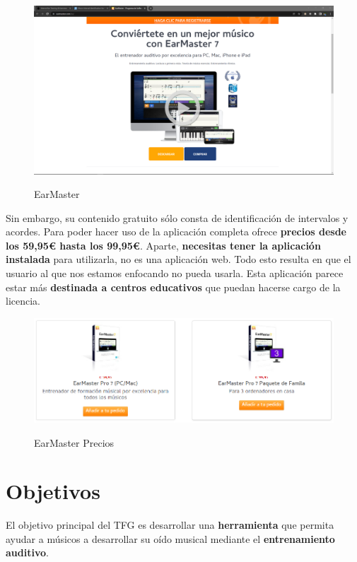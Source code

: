 \documentclass[12pt,twoside,titlepage]{report}
\begin{document}
\begin{figure}[H] 
    \includegraphics[scale=0.25]{Estado del Arte/earmaster}
    \centering
    \label{fig:earmaster}
    \caption{EarMaster}
\end{figure}

Sin embargo, su contenido gratuito sólo consta de identificación de intervalos y acordes. Para poder hacer uso de la aplicación completa ofrece \textbf{precios desde los 59,95€ hasta los 99,95€}. Aparte, \textbf{necesitas tener la aplicación instalada} para utilizarla, no es una aplicación web. Todo esto resulta en que el usuario al que nos estamos enfocando no pueda usarla. Esta aplicación parece estar más \textbf{destinada a centros educativos} que puedan hacerse cargo de la licencia.

\begin{figure}[H] 
    \includegraphics[scale=0.5]{Estado del Arte/earmasterprices}
    \centering
    \label{fig:earmasterprices}
    \caption{EarMaster Precios}
\end{figure}

\section{Objetivos}

El objetivo principal del TFG es desarrollar una \textbf{herramienta} que permita ayudar a músicos a desarrollar su oído musical mediante el \textbf{entrenamiento auditivo}.
\end{document}
